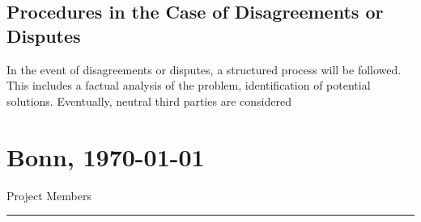 \documentclass{article}
\begin{document}
\subsection{Procedures in the Case of Disagreements or Disputes}
In the event of disagreements or disputes, a structured process will be followed.
This includes a factual analysis of the problem, identification of potential solutions.
Eventually, neutral third parties are considered

\vfill
\section*{Bonn, \today}

\begin{minipage}{1\textwidth}
	\centering
	Project Members
	\hrule
\end{minipage}
\end{document}
